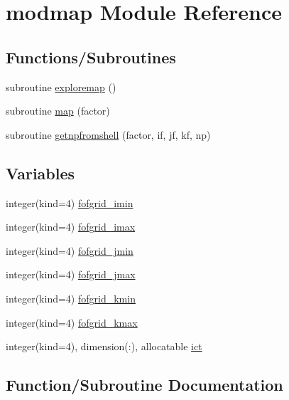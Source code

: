 \hypertarget{namespacemodmap}{}\section{modmap Module Reference}
\label{namespacemodmap}
\subsection*{Functions/\+Subroutines}
\begin{DoxyCompactItemize}
\item 
subroutine \hyperlink{namespacemodmap_a4dabe74fe33947e22abfde9897dff20b}{exploremap} ()
\item 
subroutine \hyperlink{namespacemodmap_af6328324bc6aaca47018ded5f4c8e8cb}{map} (factor)
\item 
subroutine \hyperlink{namespacemodmap_a61603fa7aecee06e2efaa0c647e35df6}{getnpfromshell} (factor, if, jf, kf, np)
\end{DoxyCompactItemize}
\subsection*{Variables}
\begin{DoxyCompactItemize}
\item 
integer(kind=4) \hyperlink{namespacemodmap_a4c96661037ebd0e043cf2967b7e94067}{fofgrid\+\_\+imin}
\item 
integer(kind=4) \hyperlink{namespacemodmap_adf255364fd93d9af29d1f179bf50f5ba}{fofgrid\+\_\+imax}
\item 
integer(kind=4) \hyperlink{namespacemodmap_ac44fd964c6a2812634e903df91c5bcb6}{fofgrid\+\_\+jmin}
\item 
integer(kind=4) \hyperlink{namespacemodmap_a1644332b29d20583060c9316d8cd2fa1}{fofgrid\+\_\+jmax}
\item 
integer(kind=4) \hyperlink{namespacemodmap_ac4f40bdda34481044d92691776976abc}{fofgrid\+\_\+kmin}
\item 
integer(kind=4) \hyperlink{namespacemodmap_a7273a00ef7481fa382b6016d39a752e3}{fofgrid\+\_\+kmax}
\item 
integer(kind=4), dimension(\+:), allocatable \hyperlink{namespacemodmap_af68652ecce879493f3a84180017cccbd}{ict}
\end{DoxyCompactItemize}


\subsection{Function/\+Subroutine Documentation}
